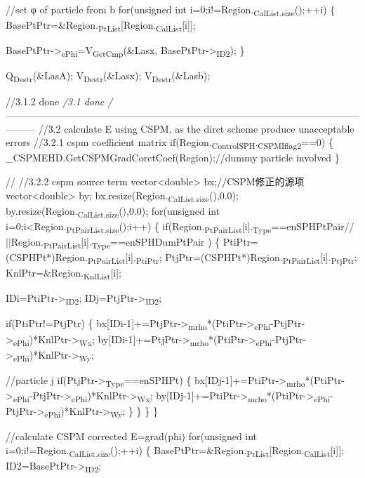 \documentclass[presentation]{beamer}
\begin{document}
//set φ of particle from b
for(unsigned int i=0;i!=Region.\textsubscript{CalList.size}();++i)
  \{
    BasePtPtr=\&Region.\textsubscript{PtList}[Region.\textsubscript{CalList}[i]];

  BasePtPtr->\textsubscript{ePhi}=V\textsubscript{GetCmp}(\&Lasx, BasePtPtr->\textsubscript{ID2});
\}

Q\textsubscript{Destr}(\&LasA);
V\textsubscript{Destr}(\&Lasx);
V\textsubscript{Destr}(\&Lasb);

//3.1.2 done
\emph{/3.1 done
/}---------------------------------------------------------------------------------------------------------------------
//3.2 calculate E using CSPM, as the dirct scheme produce unacceptable errors
//3.2.1 cspm coefficient matrix
if(Region.\textsubscript{ControlSPH}.\textsubscript{CSPMIflag2}==0)
  \{
    \_CSPMEHD.GetCSPMGradCorctCoef(Region);//dummy particle involved
  \}

// //3.2.2 cspm source term
vector<double> bx;//CSPM修正的源项
vector<double> by;
bx.resize(Region.\textsubscript{CalList.size}(),0.0);
by.resize(Region.\textsubscript{CalList.size}(),0.0);
for(unsigned int i=0;i<Region.\textsubscript{PtPairList.size}();i++)
  \{
    if(Region.\textsubscript{PtPairList}[i].\textsubscript{Type}==enSPHPtPair// ||Region.\textsubscript{PtPairList}[i].\textsubscript{Type}==enSPHDumPtPair
       )
      \{
        PtiPtr=(CSPHPt*)Region.\textsubscript{PtPairList}[i].\textsubscript{PtiPtr};
        PtjPtr=(CSPHPt*)Region.\textsubscript{PtPairList}[i].\textsubscript{PtjPtr};
        KnlPtr=\&Region.\textsubscript{KnlList}[i];

IDi=PtiPtr->\textsubscript{ID2};
IDj=PtjPtr->\textsubscript{ID2};

if(PtiPtr!=PtjPtr)
  \{
    bx[IDi-1]+=PtjPtr->\textsubscript{mrho}*(PtiPtr->\textsubscript{ePhi}-PtjPtr->\textsubscript{ePhi})*KnlPtr->\textsubscript{Wx};
    by[IDi-1]+=PtjPtr->\textsubscript{mrho}*(PtiPtr->\textsubscript{ePhi}-PtjPtr->\textsubscript{ePhi})*KnlPtr->\textsubscript{Wy};

          //particle j
          if(PtjPtr->\textsubscript{Type}==enSPHPt)
            \{
              bx[IDj-1]+=PtiPtr->\textsubscript{mrho}*(PtiPtr->\textsubscript{ePhi}-PtjPtr->\textsubscript{ePhi})*KnlPtr->\textsubscript{Wx};
              by[IDj-1]+=PtiPtr->\textsubscript{mrho}*(PtiPtr->\textsubscript{ePhi}-PtjPtr->\textsubscript{ePhi})*KnlPtr->\textsubscript{Wy};
            \}
        \}
    \}
\}

//calculate CSPM corrected E=grad(phi)
for(unsigned int i=0;i!=Region.\textsubscript{CalList.size}();++i)
  \{
    BasePtPtr=\&Region.\textsubscript{PtList}[Region.\textsubscript{CalList}[i]];
    ID2=BasePtPtr->\textsubscript{ID2};
\end{document}
